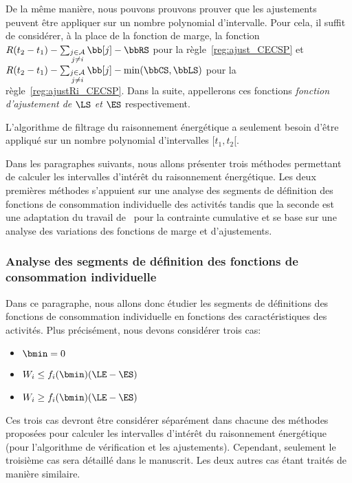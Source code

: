 De la même manière, nous pouvons prouvons prouver que les ajustements
peuvent être appliquer sur un nombre polynomial d'intervalle. Pour
cela, il suffit de considérer, à la place de la fonction de marge, la
fonction $ R(t_2-t_1) - \sum_{\substack{j \in \A\\ j \neq i}} \bb[j] -
\bbRS$ pour la règle~\ref{reg:ajust_CECSP} et $ R(t_2-t_1) - \sum_{\substack{j \in
    \A\\ j \neq i}} \bb[j] - \min(\bbCS,\bbLS)$ pour la
règle~\ref{reg:ajustRi_CECSP}. Dans la suite, appellerons ces
fonctions {\it fonction d'ajustement de $\LS$ et $\ES$} respectivement. 

\begin{theo}
  L'algorithme de filtrage du raisonnement énergétique a seulement
  besoin d'être appliqué sur un nombre polynomial d'intervalles $[t_1,t_2[$.
\end{theo}

Dans les paragraphes suivants, nous allons présenter trois méthodes
permettant de calculer les intervalles d'intérêt du raisonnement
énergétique. Les deux premières méthodes s'appuient sur une analyse
des segments de définition des fonctions de consommation individuelle
des activités tandis que la seconde est une adaptation du travail
de~\cite{DP} pour la contrainte cumulative et se base sur une analyse
des variations des fonctions de marge et d'ajustements.

\subsubsection{Analyse des segments de définition des fonctions de 
  consommation individuelle}

Dans ce paragraphe, nous allons donc étudier les segments de
définitions des fonctions de consommation individuelle en fonctions
des caractéristiques des activités. Plus précisément, nous devons
considérer trois cas:
\begin{itemize}
\item $\bmin=0$
\item $W_i \le f_i(\bmin)(\LE-\ES)$
\item $W_i \ge f_i(\bmin)(\LE-\ES)$
\end{itemize}
Ces trois cas devront être considérer séparément dans chacune des
méthodes proposées pour calculer les intervalles d'intérêt du
raisonnement énergétique (pour l'algorithme de vérification et les
ajustements). Cependant, seulement le troisième cas sera détaillé dans
le manuscrit. Les deux autres cas étant traités de manière similaire. 

